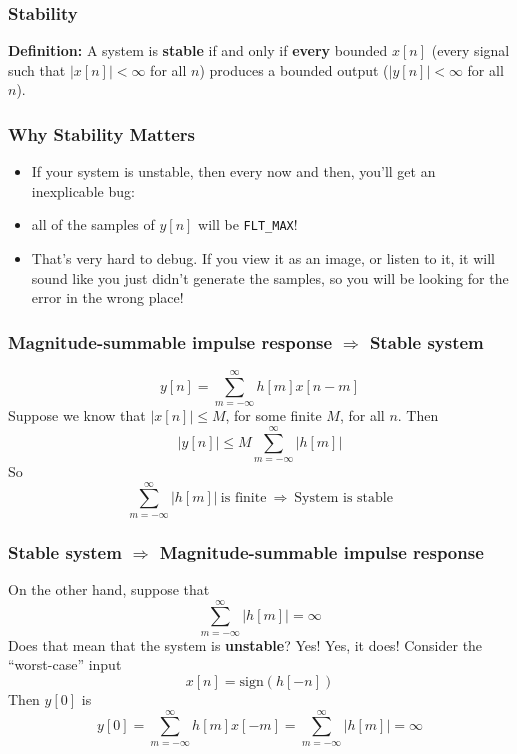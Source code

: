 \documentclass{beamer}
\begin{document}
\begin{frame}
  \frametitle{Stability}

  {\bf Definition:} A system is {\bf stable} if and only if {\bf every}
  bounded $x[n]$ (every signal such that $|x[n]|<\infty$ for all $n$) produces a bounded output
  ($|y[n]|<\infty$ for all $n$).
\end{frame}

\begin{frame}
  \frametitle{Why Stability Matters}

  \begin{itemize}
  \item If your system is unstable, then every now and then, you'll
    get an inexplicable bug:
  \item all of the samples of $y[n]$ will be {\tt FLT\_MAX}!
  \item That's very hard to debug.  If you view it as an image, or
    listen to it, it will sound like you just didn't generate the
    samples, so you will be looking for the error in the wrong place!
  \end{itemize}
    
\end{frame}

\begin{frame}
  \frametitle{Magnitude-summable impulse response $\Rightarrow$ Stable system}

  \begin{displaymath}
    y[n] = \sum_{m=-\infty}^\infty h[m] x[n-m]
  \end{displaymath}
  Suppose we know that $|x[n]|\le M$, for some finite $M$, for all $n$.  Then
  \begin{displaymath}
    |y[n]| \le  M \sum_{m=-\infty}^\infty |h[m]|
  \end{displaymath}
  So
  \begin{displaymath}
    \sum_{m=-\infty}^\infty |h[m]|~\mbox{is finite}~\Rightarrow~\mbox{System is stable}
  \end{displaymath}
\end{frame}

\begin{frame}
  \frametitle{Stable system $\Rightarrow$ Magnitude-summable impulse response}

  On the other hand, suppose that 
  \begin{displaymath}
    \sum_{m=-\infty}^\infty |h[m]|=\infty
  \end{displaymath}
  Does that mean that the system is {\bf unstable}?  Yes!  Yes, it
  does!  Consider the ``worst-case'' input
  \begin{displaymath}
    x[n] = \mbox{sign}\left(h[-n]\right)
  \end{displaymath}
  Then $y[0]$ is
  \begin{displaymath}
    y[0] = \sum_{m=-\infty}^\infty h[m] x[-m] = \sum_{m=-\infty}^\infty |h[m]|=\infty
  \end{displaymath}
\end{frame}
\end{document}
